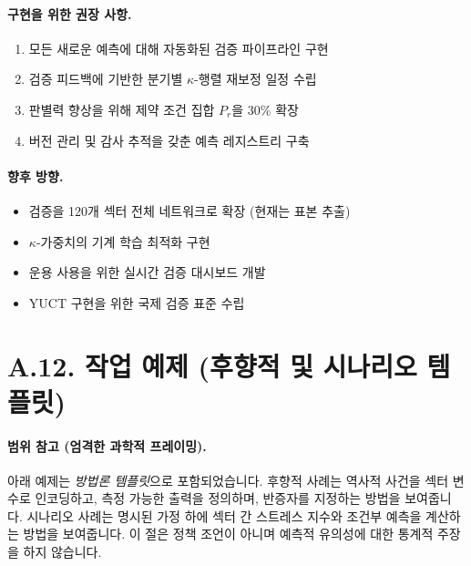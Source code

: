 \documentclass[13pt,a4paper]{article}
\begin{document}
\paragraph{구현을 위한 권장 사항.}
\begin{enumerate}[leftmargin=*]
	\item 모든 새로운 예측에 대해 자동화된 검증 파이프라인 구현
	\item 검증 피드백에 기반한 분기별 $\kappa$-행렬 재보정 일정 수립
	\item 판별력 향상을 위해 제약 조건 집합 $P_r$을 30\% 확장
	\item 버전 관리 및 감사 추적을 갖춘 예측 레지스트리 구축
\end{enumerate}

\paragraph{향후 방향.}
\begin{itemize}
	\item 검증을 120개 섹터 전체 네트워크로 확장 (현재는 표본 추출)
	\item $\kappa$-가중치의 기계 학습 최적화 구현
	\item 운용 사용을 위한 실시간 검증 대시보드 개발
	\item YUCT 구현을 위한 국제 검증 표준 수립
\end{itemize}

\section*{A.12. 작업 예제 (후향적 및 시나리오 템플릿)}
\label{sec:worked-examples}

\paragraph{범위 참고 (엄격한 과학적 프레이밍).}
아래 예제는 \emph{방법론 템플릿}으로 포함되었습니다. 후향적 사례는 역사적 사건을 섹터 변수로 인코딩하고, 측정 가능한 출력을 정의하며, 반증자를 지정하는 방법을 보여줍니다. 시나리오 사례는 명시된 가정 하에 섹터 간 스트레스 지수와 조건부 예측을 계산하는 방법을 보여줍니다. 이 절은 정책 조언이 아니며 예측적 유의성에 대한 통계적 주장을 하지 않습니다.
\end{document}

